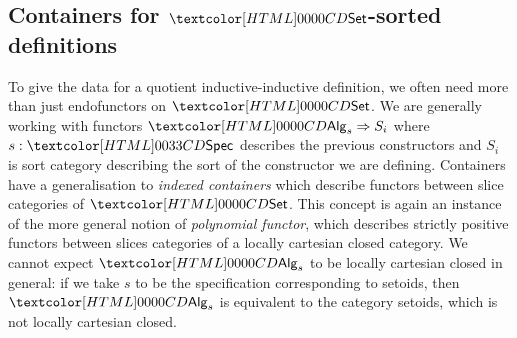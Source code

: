 \subsection{Containers for $\Set$-sorted definitions}
To give the data for a quotient inductive-inductive definition, we
often need more than just endofunctors on $\Set$. We are generally
working with functors $\Func{\Alg_s}{S_i}$ where $s : \specty$
describes the previous constructors and $S_i$ is sort category
describing the sort of the constructor we are defining. Containers
have a generalisation to \emph{indexed containers} which describe
functors between slice categories of $\Set$. This concept is again an
instance of the more general notion of \emph{polynomial functor},
which describes strictly positive functors between slices categories
of a locally cartesian closed category. We cannot expect $\Alg_s$ to
be locally cartesian closed in general: if we take $s$ to be the
specification corresponding to setoids, then $\Alg_s$ is equivalent to
the category setoids, which is not locally cartesian closed.

